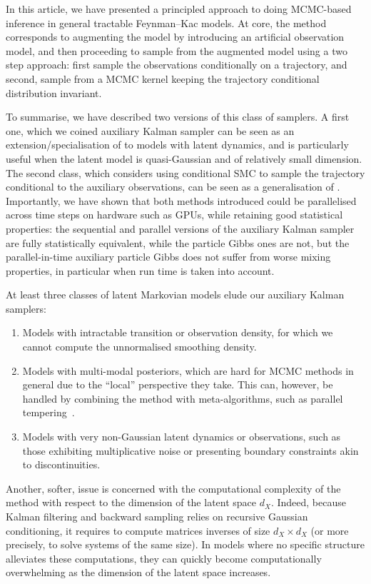 In this article, we have presented a principled approach to doing MCMC-based inference in general tractable Feynman--Kac models. At core, the method corresponds to augmenting the model by introducing an artificial observation model, and then proceeding to sample from the augmented model using a two step approach: first sample the observations conditionally on a trajectory, and second, sample from a MCMC kernel keeping the trajectory conditional distribution invariant.

To summarise, we have described two versions of this class of samplers. A first one, which we coined auxiliary Kalman sampler can be seen as an extension/specialisation of \citet{titsias2018} to models with latent dynamics, and is particularly useful when the latent model is quasi-Gaussian and of relatively small dimension. The second class, which considers using conditional SMC to sample the trajectory conditional to the auxiliary observations, can be seen as a generalisation of \citet{finke2021csmc}. Importantly, we have shown that both methods introduced could be parallelised across time steps on hardware such as GPUs, while retaining good statistical properties: the sequential and parallel versions of the auxiliary Kalman sampler are fully statistically equivalent, while the particle Gibbs ones are not, but the parallel-in-time auxiliary particle Gibbs does not suffer from worse mixing properties, in particular when run time is taken into account.

At least three classes of latent Markovian models elude our auxiliary Kalman samplers:
\begin{enumerate}
    \item Models with intractable transition or observation density, for which we cannot compute the unnormalised smoothing density.
    \item Models with multi-modal posteriors, which are hard for MCMC methods in general due to the ``local'' perspective they take. This can, however, be handled by combining the method with meta-algorithms, such as parallel tempering~\citep{geyer1991markov}.
    \item Models with very non-Gaussian latent dynamics or observations, such as those exhibiting multiplicative noise or presenting boundary constraints akin to discontinuities.
\end{enumerate}
Another, softer, issue is concerned with the computational complexity of the method with respect to the dimension of the latent space $d_X$. Indeed, because Kalman filtering and backward sampling relies on recursive Gaussian conditioning, it requires to compute matrices inverses of size $d_X \times d_X$ (or more precisely, to solve systems of the same size). In models where no specific structure alleviates these computations, they can quickly become computationally overwhelming as the dimension of the latent space increases.

